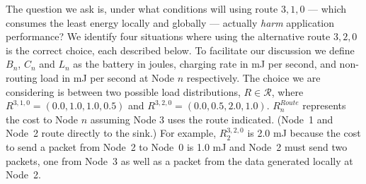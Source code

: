 The question we ask is, under what conditions will using route $3,1,0$ ---
which consumes the least energy locally and globally --- actually
\textit{harm} application performance?  We identify four situations where
using the alternative route $3,2,0$ is the correct choice, each described
below. To facilitate our discussion we define $B_n$, $C_n$ and $L_n$ as the
battery in joules, charging rate in mJ per second, and non-routing load
in mJ per second at Node $n$ respectively. The choice we are considering
is between two possible load distributions, $R \in \mathcal{R}$, where
$R^{3,1,0} = (0.0, 1.0, 1.0, 0.5)$ and $R^{3,2,0} = (0.0, 0.5, 2.0, 1.0)$.
$R^{Route}_n$ represents the cost to Node $n$ assuming Node 3 uses the route
indicated. (Node~1 and Node~2 route directly to the sink.)  For example,
$R^{3,2,0}_2$ is 2.0 mJ because the cost to send a packet from Node~2 to
Node~0 is 1.0 mJ and Node~2 must send two packets, one from Node~3 as well as
a packet from the data generated locally at Node~2.

\vspace{0.1in}

